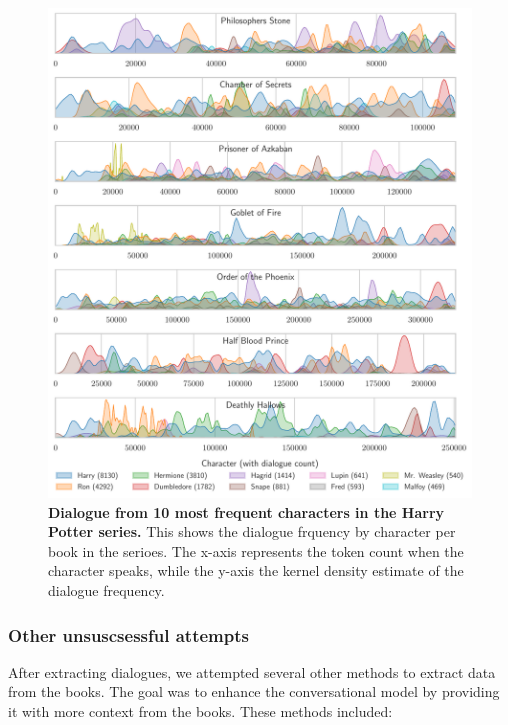 \documentclass[fleqn,moreauthors,10pt]{ds_report}
\begin{document}
\begin{figure}[H]
	
	\centering
	\includegraphics[width=\linewidth]{hp_dialogue.pdf}
	\caption{\textbf{Dialogue from 10 most frequent characters in the Harry Potter series.} This shows the dialogue frquency by character per book in the serioes. The x-axis represents the token count when the character speaks, while the y-axis the kernel density estimate of the dialogue frequency.}
	\label{fig:hp_dialogue}
\end{figure}




\subsubsection*{Other unsuscsessful attempts}

After extracting dialogues, we attempted several other methods to extract data from the books. The goal was to enhance the conversational model by providing it with more context from the books. These methods included:
\end{document}
